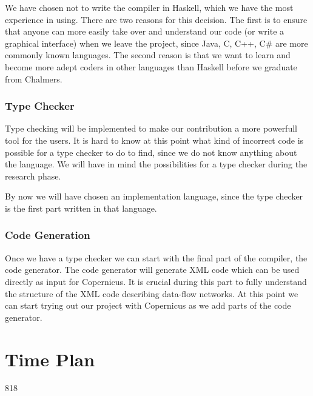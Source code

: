 \documentclass[a4paper]{article}
\begin{document}
We have chosen not to write the compiler in Haskell, which we have the
most experience in using. There are two reasons for this decision. The
first is to ensure that anyone can more easily take over and
understand our code (or write a graphical interface) when we leave the
project, since Java, C, C++, C\# are more commonly known languages. The
second reason is that we want to learn and become more adept coders in
other languages than Haskell before we graduate from Chalmers.

\subsubsection{Type Checker}
Type checking will be implemented to make our contribution a more
powerfull tool for the users. It is hard to know at this point what
kind of incorrect code is possible for a type checker to do to find,
since we do not know anything about the language. We will have in mind
the possibilities for a type checker during the research phase.

By now we will have chosen an implementation language, since the type
checker is the first part written in that language.

\subsubsection{Code Generation}
Once we have a type checker we can start with the final part of the
compiler, the code generator. The code generator will generate XML
code which can be used directly as input for Copernicus. It is crucial
during this part to fully understand the structure of the XML code
describing data-flow networks. At this point we can start trying out
our project with Copernicus as we add parts of the code generator.


\section{Time Plan}
\begin{gantt}[
    xunitlength=0.5cm,
    fontsize=\small,
    titlefontsize=\small,
    drawledgerline=true]
  {8}{18}
  \begin{ganttitle}
  \end{ganttitle}
  \begin{ganttitle}
  \end{ganttitle}
\end{gantt}
\end{document}
